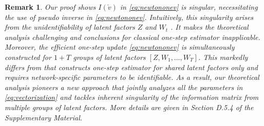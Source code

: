 \documentclass[12pt]{article}
\newtheorem{remark}{Remark}
\begin{document}
\begin{remark}\label{rm:onestepiv}
Our proof shows $I(\check{v})$ in \eqref{eq:newtononev}  is singular, necessitating the use of pseudo inverse in \eqref{eq:newtononev}. Intuitively, this  singularity arises from the unidentifiability of latent factors $Z$ and $W_t$ \citep{little2010parameter}. 
It makes the theoretical analysis challenging and conclusions for classical one-step estimator \citep{van2000asymptotic} inapplicable. 
Moreover, the efficient one-step update \eqref{eq:newtononev} is simultaneously  constructed for $1+T$ groups of 
  latent factors $[Z,W_1,\ldots, W_T]$.  
 This markedly differs from \cite{he2023semiparametric} that constructs one-step estimator for shared latent factors only and  requires network-specific parameters to be identifiable.  
As a result, our theoretical analysis pioneers a new approach that jointly analyzes 
all the parameters in \eqref{eq:vectorization}  and  tackles inherent singularity of the information matrix from multiple groups of latent factors. More details are given in  Section D.5.4 of the Supplementary Material. 
\end{remark} 
\end{document}
